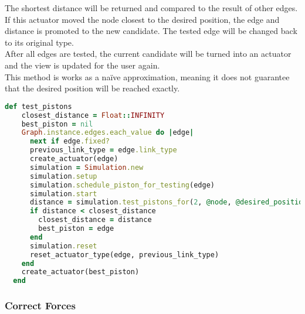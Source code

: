 The shortest distance will be returned and compared to the result of other edges. If this actuator moved the node closest to the desired position, the edge and distance is promoted to the new candidate. The tested edge will be changed back to its original type.\\
After all edges are tested, the current candidate will be turned into an actuator and the view is updated for the user again.\\
This method is works as a naïve approximation, meaning it does not guarantee that the desired position will be reached exactly.

\begin{lstlisting}[language=Ruby, label={lst:pose_check}, caption=excerpt from UI callbacks]
  def test_pistons
    closest_distance = Float::INFINITY
    best_piston = nil
    Graph.instance.edges.each_value do |edge|
      next if edge.fixed?
      previous_link_type = edge.link_type
      create_actuator(edge)
      simulation = Simulation.new
      simulation.setup
      simulation.schedule_piston_for_testing(edge)
      simulation.start
      distance = simulation.test_pistons_for(2, @node, @desired_position)
      if distance < closest_distance
        closest_distance = distance
        best_piston = edge
      end
      simulation.reset
      reset_actuator_type(edge, previous_link_type)
    end
    create_actuator(best_piston)
  end
\end{lstlisting}

\subsubsection{Correct Forces}

